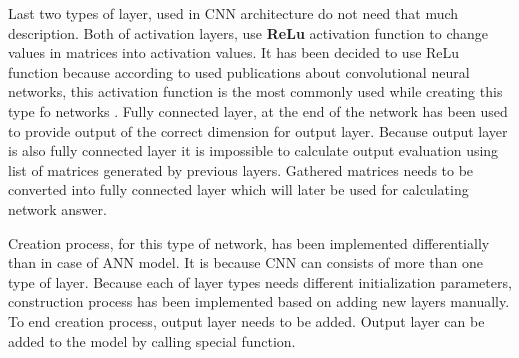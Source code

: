 Last two types of layer, used in CNN architecture do not need that much description. Both of activation layers, use \textbf{ReLu} activation function to change values in matrices into activation values. It has been decided to use ReLu function because according to used publications about convolutional neural networks, this activation function is the most commonly used while creating this type fo networks \cite{bib:book-statistical-learning,bib:book-generative-deep-learning}. Fully connected layer, at the end of the network has been used to provide output of the correct dimension for output layer. Because output layer is also fully connected layer it is impossible to calculate output evaluation using list of matrices generated by previous layers. Gathered matrices needs to be converted into fully connected layer which will later be used for calculating network answer.

Creation process, for this type of network, has been implemented differentially than in case of ANN model. It is because CNN can consists of more than one type of layer. Because each of layer types needs different initialization parameters, construction process has been implemented based on adding new layers manually. To end creation process, output layer needs to be added. Output layer can be added to the model by calling special function.

